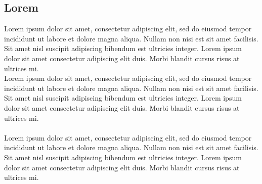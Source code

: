 \subsection{Lorem}
Lorem ipsum dolor sit amet, consectetur adipiscing elit, sed do eiusmod tempor incididunt ut labore et dolore magna aliqua. Nullam non nisi est sit amet facilisis. Sit amet nisl suscipit adipiscing bibendum est ultricies integer. Lorem ipsum dolor sit amet consectetur adipiscing elit duis. Morbi blandit cursus risus at ultrices mi. \\
Lorem ipsum dolor sit amet, consectetur adipiscing elit, sed do eiusmod tempor incididunt ut labore et dolore magna aliqua. Nullam non nisi est sit amet facilisis. Sit amet nisl suscipit adipiscing bibendum est ultricies integer. Lorem ipsum dolor sit amet consectetur adipiscing elit duis. Morbi blandit cursus risus at ultrices mi.
\\\\
Lorem ipsum dolor sit amet, consectetur adipiscing elit, sed do eiusmod tempor incididunt ut labore et dolore magna aliqua. Nullam non nisi est sit amet facilisis. Sit amet nisl suscipit adipiscing bibendum est ultricies integer. Lorem ipsum dolor sit amet consectetur adipiscing elit duis. Morbi blandit cursus risus at ultrices mi.
\newpage